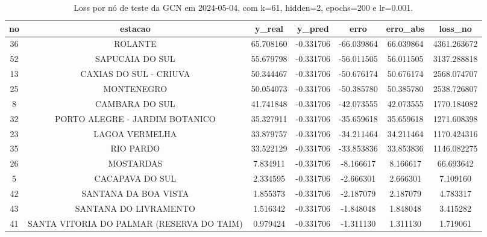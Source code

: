 \begin{table}[h]
\centering
\caption{Loss por nó de teste da GCN em 2024-05-04, com k=61, hidden=2, epochs=200 e lr=0.001.}
\label{tab:gcn_loss_nodes_k61_hidden2}
\begin{tabular}{ccccccc}
\toprule
no & estacao & y\_real & y\_pred & erro & erro\_abs & loss\_no \\
\midrule
36 & ROLANTE & 65.708160 & -0.331706 & -66.039864 & 66.039864 & 4361.263672 \\
52 & SAPUCAIA DO SUL & 55.679798 & -0.331706 & -56.011505 & 56.011505 & 3137.288818 \\
13 & CAXIAS DO SUL - CRIUVA & 50.344467 & -0.331706 & -50.676174 & 50.676174 & 2568.074707 \\
25 & MONTENEGRO & 50.054073 & -0.331706 & -50.385780 & 50.385780 & 2538.726807 \\
8 & CAMBARA DO SUL & 41.741848 & -0.331706 & -42.073555 & 42.073555 & 1770.184082 \\
32 & PORTO ALEGRE - JARDIM BOTANICO & 35.327911 & -0.331706 & -35.659618 & 35.659618 & 1271.608398 \\
23 & LAGOA VERMELHA & 33.879757 & -0.331706 & -34.211464 & 34.211464 & 1170.424316 \\
35 & RIO PARDO & 33.522129 & -0.331706 & -33.853836 & 33.853836 & 1146.082275 \\
26 & MOSTARDAS & 7.834911 & -0.331706 & -8.166617 & 8.166617 & 66.693642 \\
5 & CACAPAVA DO SUL & 2.334595 & -0.331706 & -2.666301 & 2.666301 & 7.109160 \\
42 & SANTANA DA BOA VISTA & 1.855373 & -0.331706 & -2.187079 & 2.187079 & 4.783317 \\
43 & SANTANA DO LIVRAMENTO & 1.516342 & -0.331706 & -1.848048 & 1.848048 & 3.415282 \\
41 & SANTA VITORIA DO PALMAR (RESERVA DO TAIM) & 0.979424 & -0.331706 & -1.311130 & 1.311130 & 1.719061 \\
\bottomrule
\end{tabular}
\end{table}
